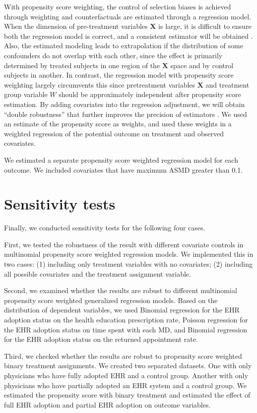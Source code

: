 \documentclass[12pt]{report}
\begin{document}
With propensity score weighting, the control of selection biases is achieved through weighting and counterfactuals are estimated through a regression model. When the dimension of pre-treatment variables $\mathbf{X}$ is large, it is difficult to ensure both the regression model is correct, and a consistent estimator will be obtained \citep{rubin1997estimating}. Also, the estimated modeling leads to extrapolation if the distribution of some confounders do not overlap with each other, since the effect is primarily determined by treated subjects in one region of the $\textbf{X}$ space and by control subjects in another. In contrast, the regression model with propensity score weighting largely circumvents this since pretreatment variables $\textbf{X}$ and treatment group variable $W$ should be approximately independent after propensity score estimation. By adding covariates into the regression adjustment, we will obtain ``double robustness'' that further improves the precision of estimators \citep{lunceford2004stratification}. We used an estimate of the propensity score as weights, and used these weights in a weighted regression of the potential outcome on treatment and observed covariates.

We estimated a separate propensity score weighted regression model for each outcome. We included covariates that have maximum ASMD greater than 0.1. 

\section{Sensitivity tests}
\label{sec:spec}
Finally, we conducted sensitivity tests for the following four cases.

First, we tested the robustness of the result with different covariate controls in multinomial propensity score weighted regression models. We implemented this in two cases: (1) including only treatment variables with no covariates; (2) including all possible covariates and the treatment assignment variable.

Second, we examined whether the results are robust to different multinomial propensity score weighted generalized regression models. Based on the distribution of dependent variables, we used Binomial regression for the EHR adoption status on the health education prescription rate, Poisson regression for the EHR adoption status on time spent with each MD, and Binomial regression for the EHR adoption status on the returned appointment rate.

Third, we checked whether the results are robust to propensity score weighted binary treatment assignments. We created two separated datasets. One with only physicians who have fully adopted EHR and a control group. Another with only physicians who have partially adopted an EHR system and a control group. We estimated the propensity score with binary treatment and estimated the effect of full EHR adoption and partial EHR adoption on outcome variables.
\end{document}

